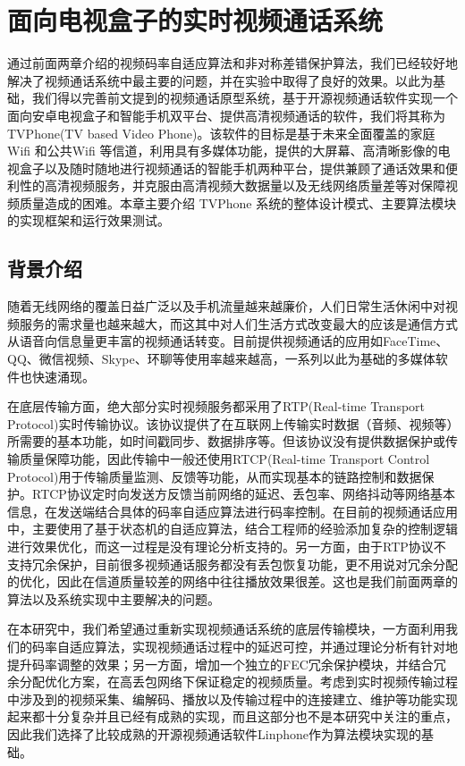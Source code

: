 \chapter{面向电视盒子的实时视频通话系统}
\label{chap:system}
通过前面两章介绍的视频码率自适应算法和非对称差错保护算法，我们已经较好地解决了视频通话系统中最主要的问题，并在实验中取得了良好的效果。以此为基础，我们得以完善前文提到的视频通话原型系统，基于开源视频通话软件实现一个面向安卓电视盒子和智能手机双平台、提供高清视频通话的软件，我们将其称为TVPhone(TV based Video Phone)。该软件的目标是基于未来全面覆盖的家庭Wifi 和公共Wifi 等信道，利用具有多媒体功能，提供的大屏幕、高清晰影像的电视盒子以及随时随地进行视频通话的智能手机两种平台，提供兼顾了通话效果和便利性的高清视频服务，并克服由高清视频大数据量以及无线网络质量差等对保障视频质量造成的困难。本章主要介绍 TVPhone 系统的整体设计模式、主要算法模块的实现框架和运行效果测试。

\section{背景介绍}
随着无线网络的覆盖日益广泛以及手机流量越来越廉价，人们日常生活休闲中对视频服务的需求量也越来越大，而这其中对人们生活方式改变最大的应该是通信方式从语音向信息量更丰富的视频通话转变。目前提供视频通话的应用如FaceTime、QQ、微信视频、Skype、环聊等使用率越来越高，一系列以此为基础的多媒体软件也快速涌现。

在底层传输方面，绝大部分实时视频服务都采用了RTP(Real-time Transport Protocol)实时传输协议。该协议提供了在互联网上传输实时数据（音频、视频等）所需要的基本功能，如时间戳同步、数据排序等。但该协议没有提供数据保护或传输质量保障功能，因此传输中一般还使用RTCP(Real-time Transport Control Protocol)用于传输质量监测、反馈等功能，从而实现基本的链路控制和数据保护。RTCP协议定时向发送方反馈当前网络的延迟、丢包率、网络抖动等网络基本信息，在发送端结合具体的码率自适应算法进行码率控制。在目前的视频通话应用中，主要使用了基于状态机的自适应算法，结合工程师的经验添加复杂的控制逻辑进行效果优化，而这一过程是没有理论分析支持的。另一方面，由于RTP协议不支持冗余保护，目前很多视频通话服务都没有丢包恢复功能，更不用说对冗余分配的优化，因此在信道质量较差的网络中往往播放效果很差。这也是我们前面两章的算法以及系统实现中主要解决的问题。

在本研究中，我们希望通过重新实现视频通话系统的底层传输模块，一方面利用我们的码率自适应算法，实现视频通话过程中的延迟可控，并通过理论分析有针对地提升码率调整的效果；另一方面，增加一个独立的FEC冗余保护模块，并结合冗余分配优化方案，在高丢包网络下保证稳定的视频质量。考虑到实时视频传输过程中涉及到的视频采集、编解码、播放以及传输过程中的连接建立、维护等功能实现起来都十分复杂并且已经有成熟的实现，而且这部分也不是本研究中关注的重点，因此我们选择了比较成熟的开源视频通话软件Linphone\cite{website:linphone}作为算法模块实现的基础。


